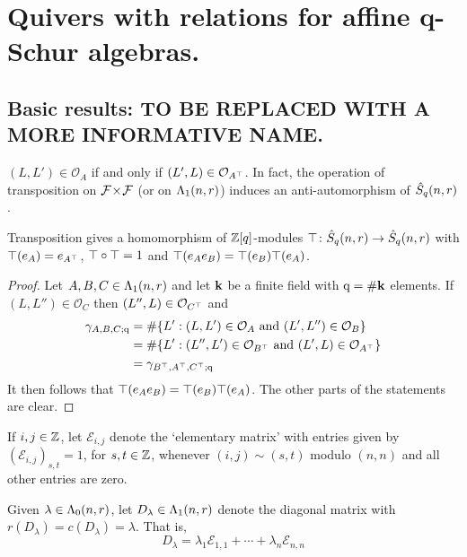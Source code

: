 \documentclass[a4paper, 11pt]{report}
\begin{document}
\chapter{Quivers with relations for affine q-Schur algebras.}


\section{Basic results: TO BE REPLACED WITH A MORE INFORMATIVE NAME.}

$(L,L')\in\mathcal{O}_A$ if and only if $(L',L)\in\mathcal{O}_{A^\top}$. In fact, the operation of transposition on ${\mathcal{F}\!\times\!\mathcal{F}}$ (or on $\Lambda_1(n,r)$) induces an anti-automorphism of $\hat{S}_q(n,r)$.
\begin{lemma}
Transposition gives a homomorphism of $\mathbb{Z}[q]$-modules $\top\colon\hat{S}_q(n,r)\to\hat{S}_q(n,r)$ with $\top(e_A) = e_{A^\top}$, $\top\circ\top = 1$ and $\top(e_A e_B) = \top(e_B)\top(e_A)$.
\end{lemma}
\begin{proof}
Let $A,B,C\in\Lambda_1(n,r)$ and let $\mathbf{k}$ be a finite field with $\mathrm{q}=\#\mathbf{k}$ elements. If $(L,L'')\in\mathcal{O}_C$ then $(L'',L)\in\mathcal{O}_{C^\top}$ and
\begin{align*}
\gamma_{A,B,C;\mathrm{q}}
&= \#\{L': (L,L')\in\mathcal{O}_A\text{ and } (L',L'')\in\mathcal{O}_B\}\\
&= \#\{L': (L'',L')\in\mathcal{O}_{B^\top}\text{ and } (L',L)\in\mathcal{O}_{A^\top}\}\\
&= \gamma_{B^\top,A^\top, C^\top;\mathrm{q}}
\end{align*}
It then follows that $\top(e_A e_B) = \top(e_B) \top(e_A)$. The other parts of the statements are clear.
\end{proof}

If $i,j\in\mathbb{Z}$, let $\mathcal{E}_{i,j}$ denote the `elementary matrix' with entries given by $(\mathcal{E}_{i,j})_{s,t}=1$, for $s,t\in\mathbb{Z}$,  whenever $(i,j)\sim (s,t)$ modulo $(n,n)$ and all other entries are zero.

Given $\lambda\in\Lambda_0(n,r)$, let $D_\lambda\in\Lambda_1(n,r)$ denote the diagonal matrix with $r(D_\lambda)=c(D_\lambda) = \lambda$. That is,
\begin{equation*}
D_\lambda = \lambda_1 \mathcal{E}_{1,1} +\cdots + \lambda_n \mathcal{E}_{n,n}
\end{equation*}
\end{document}
